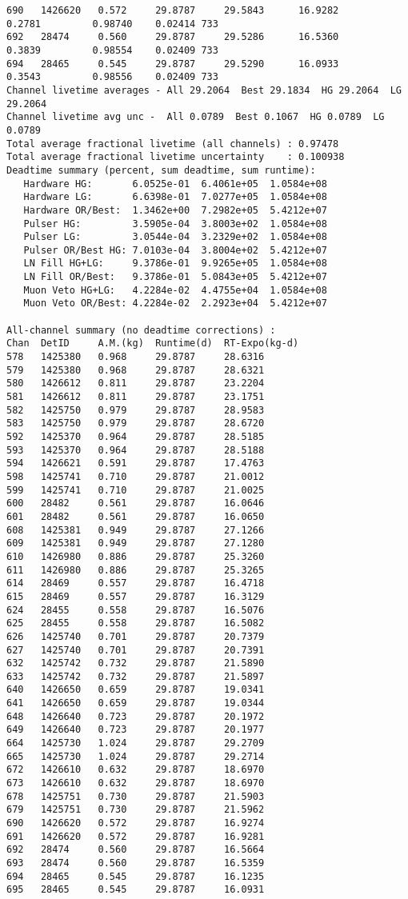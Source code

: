 \documentclass[notitlepage,rmp,aps,10pt]{revtex4-1}
\begin{document}
\begin{verbatim}
690   1426620   0.572     29.8787     29.5843      16.9282        0.2781         0.98740    0.02414 733
692   28474     0.560     29.8787     29.5286      16.5360        0.3839         0.98554    0.02409 733
694   28465     0.545     29.8787     29.5290      16.0933        0.3543         0.98556    0.02409 733
Channel livetime averages - All 29.2064  Best 29.1834  HG 29.2064  LG 29.2064
Channel livetime avg unc -  All 0.0789  Best 0.1067  HG 0.0789  LG 0.0789
Total average fractional livetime (all channels) : 0.97478
Total average fractional livetime uncertainty    : 0.100938
Deadtime summary (percent, sum deadtime, sum runtime):
   Hardware HG:       6.0525e-01  6.4061e+05  1.0584e+08
   Hardware LG:       6.6398e-01  7.0277e+05  1.0584e+08
   Hardware OR/Best:  1.3462e+00  7.2982e+05  5.4212e+07
   Pulser HG:         3.5905e-04  3.8003e+02  1.0584e+08
   Pulser LG:         3.0544e-04  3.2329e+02  1.0584e+08
   Pulser OR/Best HG: 7.0103e-04  3.8004e+02  5.4212e+07
   LN Fill HG+LG:     9.3786e-01  9.9265e+05  1.0584e+08
   LN Fill OR/Best:   9.3786e-01  5.0843e+05  5.4212e+07
   Muon Veto HG+LG:   4.2284e-02  4.4755e+04  1.0584e+08
   Muon Veto OR/Best: 4.2284e-02  2.2923e+04  5.4212e+07

All-channel summary (no deadtime corrections) :
Chan  DetID     A.M.(kg)  Runtime(d)  RT-Expo(kg-d)
578   1425380   0.968     29.8787     28.6316
579   1425380   0.968     29.8787     28.6321
580   1426612   0.811     29.8787     23.2204
581   1426612   0.811     29.8787     23.1751
582   1425750   0.979     29.8787     28.9583
583   1425750   0.979     29.8787     28.6720
592   1425370   0.964     29.8787     28.5185
593   1425370   0.964     29.8787     28.5188
594   1426621   0.591     29.8787     17.4763
598   1425741   0.710     29.8787     21.0012
599   1425741   0.710     29.8787     21.0025
600   28482     0.561     29.8787     16.0646
601   28482     0.561     29.8787     16.0650
608   1425381   0.949     29.8787     27.1266
609   1425381   0.949     29.8787     27.1280
610   1426980   0.886     29.8787     25.3260
611   1426980   0.886     29.8787     25.3265
614   28469     0.557     29.8787     16.4718
615   28469     0.557     29.8787     16.3129
624   28455     0.558     29.8787     16.5076
625   28455     0.558     29.8787     16.5082
626   1425740   0.701     29.8787     20.7379
627   1425740   0.701     29.8787     20.7391
632   1425742   0.732     29.8787     21.5890
633   1425742   0.732     29.8787     21.5897
640   1426650   0.659     29.8787     19.0341
641   1426650   0.659     29.8787     19.0344
648   1426640   0.723     29.8787     20.1972
649   1426640   0.723     29.8787     20.1977
664   1425730   1.024     29.8787     29.2709
665   1425730   1.024     29.8787     29.2714
672   1426610   0.632     29.8787     18.6970
673   1426610   0.632     29.8787     18.6970
678   1425751   0.730     29.8787     21.5903
679   1425751   0.730     29.8787     21.5962
690   1426620   0.572     29.8787     16.9274
691   1426620   0.572     29.8787     16.9281
692   28474     0.560     29.8787     16.5664
693   28474     0.560     29.8787     16.5359
694   28465     0.545     29.8787     16.1235
695   28465     0.545     29.8787     16.0931
\end{verbatim}
\end{document}

